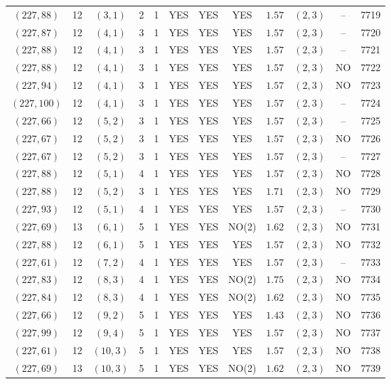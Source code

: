 \begin{longtable}{|c|c|c|c|c|c|c|c|c|c|c|c|}
$(227,88)$ & 12 & $(3,1)$ & 2 & 1 & YES & YES & YES & $1.57$ & $(2,3)$ & -- & 7719\\
$(227,87)$ & 12 & $(4,1)$ & 3 & 1 & YES & YES & YES & $1.57$ & $(2,3)$ & -- & 7720\\
$(227,88)$ & 12 & $(4,1)$ & 3 & 1 & YES & YES & YES & $1.57$ & $(2,3)$ & -- & 7721\\
$(227,88)$ & 12 & $(4,1)$ & 3 & 1 & YES & YES & YES & $1.57$ & $(2,3)$ & NO & 7722\\
$(227,94)$ & 12 & $(4,1)$ & 3 & 1 & YES & YES & YES & $1.57$ & $(2,3)$ & NO & 7723\\
$(227,100)$ & 12 & $(4,1)$ & 3 & 1 & YES & YES & YES & $1.57$ & $(2,3)$ & -- & 7724\\
$(227,66)$ & 12 & $(5,2)$ & 3 & 1 & YES & YES & YES & $1.57$ & $(2,3)$ & -- & 7725\\
$(227,67)$ & 12 & $(5,2)$ & 3 & 1 & YES & YES & YES & $1.57$ & $(2,3)$ & NO & 7726\\
$(227,67)$ & 12 & $(5,2)$ & 3 & 1 & YES & YES & YES & $1.57$ & $(2,3)$ & -- & 7727\\
$(227,88)$ & 12 & $(5,1)$ & 4 & 1 & YES & YES & YES & $1.57$ & $(2,3)$ & NO & 7728\\
$(227,88)$ & 12 & $(5,2)$ & 3 & 1 & YES & YES & YES & $1.71$ & $(2,3)$ & NO & 7729\\
$(227,93)$ & 12 & $(5,1)$ & 4 & 1 & YES & YES & YES & $1.57$ & $(2,3)$ & -- & 7730\\
$(227,69)$ & 13 & $(6,1)$ & 5 & 1 & YES & YES & NO(2) & $1.62$ & $(2,3)$ & NO & 7731\\
$(227,88)$ & 12 & $(6,1)$ & 5 & 1 & YES & YES & YES & $1.57$ & $(2,3)$ & NO & 7732\\
$(227,61)$ & 12 & $(7,2)$ & 4 & 1 & YES & YES & YES & $1.57$ & $(2,3)$ & -- & 7733\\
$(227,83)$ & 12 & $(8,3)$ & 4 & 1 & YES & YES & NO(2) & $1.75$ & $(2,3)$ & NO & 7734\\
$(227,84)$ & 12 & $(8,3)$ & 4 & 1 & YES & YES & NO(2) & $1.62$ & $(2,3)$ & NO & 7735\\
$(227,66)$ & 12 & $(9,2)$ & 5 & 1 & YES & YES & YES & $1.43$ & $(2,3)$ & NO & 7736\\
$(227,99)$ & 12 & $(9,4)$ & 5 & 1 & YES & YES & YES & $1.57$ & $(2,3)$ & NO & 7737\\
$(227,61)$ & 12 & $(10,3)$ & 5 & 1 & YES & YES & YES & $1.57$ & $(2,3)$ & NO & 7738\\
$(227,69)$ & 13 & $(10,3)$ & 5 & 1 & YES & YES & NO(2) & $1.62$ & $(2,3)$ & NO & 7739\\

\end{longtable}

